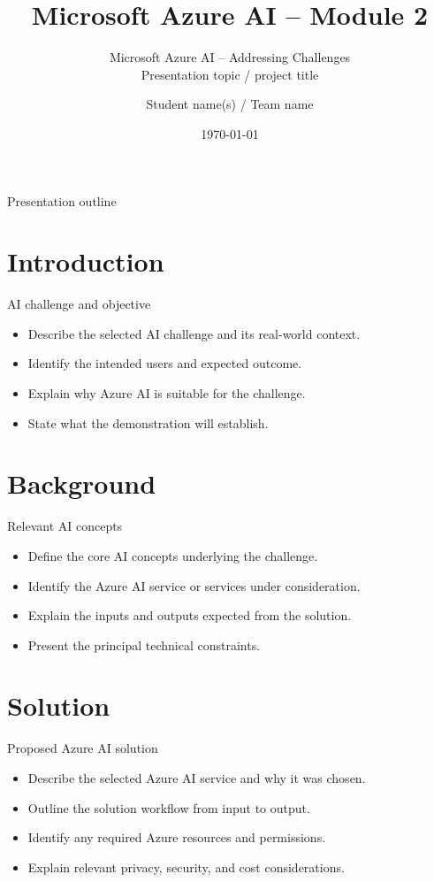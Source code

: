 \documentclass[aspectratio=169,xcolor=dvipsnames]{beamer}
\title[Azure AI -- Module 2]{Microsoft Azure AI -- Module 2}
\subtitle{Microsoft Azure AI -- Addressing Challenges \\ Presentation topic / project title}
\author[Student / team]{Student name(s) / Team name}
\institute[SUT]{Faculty of Applied Mathematics\\Silesian University of Technology}
\date{\today}
\begin{document}
\begin{frame}
\titlepage
\end{frame}
\begin{frame}{Presentation outline}
\tableofcontents
\end{frame}
\section{Introduction}
\begin{frame}{AI challenge and objective}
\begin{itemize}
\item Describe the selected AI challenge and its real-world context.
\item Identify the intended users and expected outcome.
\item Explain why Azure AI is suitable for the challenge.
\item State what the demonstration will establish.
\end{itemize}
\end{frame}
\section{Background}
\begin{frame}{Relevant AI concepts}
\begin{itemize}
\item Define the core AI concepts underlying the challenge.
\item Identify the Azure AI service or services under consideration.
\item Explain the inputs and outputs expected from the solution.
\item Present the principal technical constraints.
\end{itemize}
\end{frame}
\section{Solution}
\begin{frame}{Proposed Azure AI solution}
\begin{itemize}
\item Describe the selected Azure AI service and why it was chosen.
\item Outline the solution workflow from input to output.
\item Identify any required Azure resources and permissions.
\item Explain relevant privacy, security, and cost considerations.
\end{itemize}
\end{frame}
\end{document}
